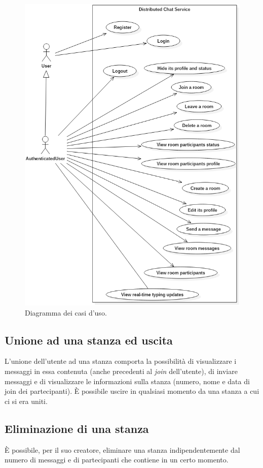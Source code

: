 \begin{figure}
  \centering
  \includegraphics[width=\linewidth, keepaspectratio]{images/UseCaseDiagram.png}
  \caption{Diagramma dei casi d'uso.}
  \label{fig: use-cases}
\end{figure}

\subsection{Unione ad una stanza ed uscita}
L'unione dell'utente ad una stanza comporta la possibilità di visualizzare i messaggi in essa contenuta (anche precedenti al \textit{join} dell'utente), di inviare messaggi e di visualizzare le informazioni sulla stanza (numero, nome e data di join dei partecipanti). È possibile uscire in qualsiasi momento da una stanza a cui ci si era uniti.

\subsection{Eliminazione di una stanza}
È possibile, per il suo creatore, eliminare una stanza indipendentemente dal numero di messaggi e di partecipanti che contiene in un certo momento.

